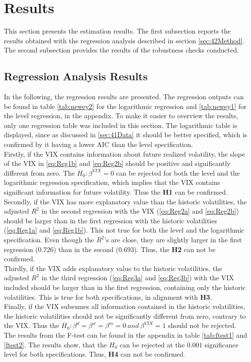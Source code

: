 
\section{Results}\label{sec:5Results}

This section presents the estimation results. The first subsection reports the results obtained with the regression analysis described in section \ref{sec:42Method}. The second subsection provides the results of the robustness checks conducted. 

\subsection{Regression Analysis Results}\label{sec:51Regression}
In the following, the regression results are presented. The regression outputs can be found in table \ref{tab:newey2} for the logarithmic regression and \ref{tab:newey1} for the level regression, in the appendix. To make it easier to overview the results, only one regression table was included in this section. The logarithmic table is displayed, since as discussed in \ref{sec:41Data} it should be better specified, which is confirmed by it having a lower AIC than the level specification.\\
Firstly, if the VIX contains information about future realized volatility, the slope of the VIX in \ref{eq:Reg1b} and \ref{eq:Reg2b} should be positive and significantly different from zero. The $H_{0}: \beta^{VIX} = 0$ can be rejected for both the level and the logarithmic regression specification, which implies that the VIX contains significant information for future volatility. Thus the \textbf{\ac{H1}} can be confirmed.\\
Secondly, if the VIX has more explanatory value than the historic volatilities, the adjusted $R^{2}$ in the second regression with the \ac{VIX} (\ref{eq:Reg2a} and \ref{eq:Reg2b}) should be larger than in the first regression with the historic volatilities (\ref{eq:Reg1a} and \ref{eq:Reg1b}). This not true for both the level and the logarithmic specification. Even though the $R^{2}$'s are close, they are slightly larger in the first regression ($0.726$) than in the second ($0.693$). Thus, the \textbf{\ac{H2}} can not be confirmed.\\
Thirdly, if the VIX adds explanatory value to the historic volatilities, the adjusted $R^{2}$ in the third regression (\ref{eq:Reg3a} and \ref{eq:Reg3b}) with the VIX included should be larger than in the first regression, containing only the historic volatilities. This is true for both specifications, in alignment with \textbf{\ac{H3}}.\\
Finally, if the VIX subsumes all information contained in the historic volatilities, the historic volatilities should not be significantly different from zero, contrary to the VIX. Thus the $H_{0}: \beta^{d} = \beta^{w} = \beta^{m} = 0 \ and \ \beta^{VIX} = 1$ should not be rejected. The results from the F-test can be found in the appendix in table \ref{tab:ftest1} and \ref{ftest2}. The results show, that the $H_{0}$ can be rejected at the $0.001$ significance level for both specifications. Thus, \textbf{\ac{H4}} can not be confirmed.

